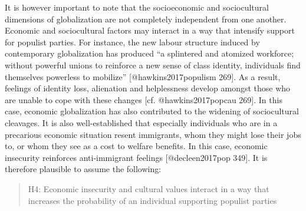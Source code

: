\documentclass[]{article}
\begin{document}
It is however important to note that the socioeconomic and sociocultural
dimensions of globalization are not completely independent from one
another. Economic and sociocultural factors may interact in a way that
intensify support for populist parties. For instance, the new labour
structure induced by contemporary globalization has produced ``a
splintered and atomized workforce; without powerful unions to reinforce
a new sense of class identity, individuals find themselves powerless to
mobilize'' {[}@hawkins2017populism 269{]}. As a result, feelings of
identity loss, alienation and helplessness develop amongst those who are
unable to cope with these changes {[}cf. @hawkins2017popcau 269{]}. In
this case, economic globalization has also contributed to the widening
of sociocultural cleavages. It is also well-established that especially
individuals who are in a precarious economic situation resent
immigrants, whom they might lose their jobs to, or whom they see as a
cost to welfare benefits. In this case, economic insecurity reinforces
anti-immigrant feelings {[}@decleen2017pop 349{]}. It is therefore
plausible to assume the following:

\begin{quote}
H4: Economic insecurity and cultural values interact in a way that
increases the probability of an individual supporting populist parties
\end{quote}
\end{document}
